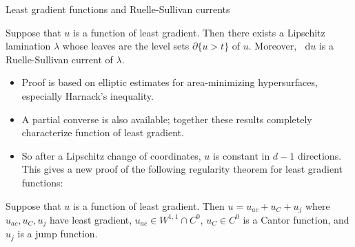 \documentclass[10pt]{beamer}
\newcommand*\dif{\mathop{}\!\mathrm{d}}
\begin{document}
\begin{frame}{Least gradient functions and Ruelle-Sullivan currents}
\begin{theorem}[B '23]
Suppose that $u$ is a function of least gradient. Then there exists a Lipschitz lamination $\lambda$ whose leaves are the level sets $\partial \{u > t\}$ of $u$.
Moreover, $\dif u$ is a Ruelle-Sullivan current of $\lambda$.
\end{theorem} \pause

\begin{itemize}
    \item Proof is based on elliptic estimates for area-minimizing hypersurfaces, especially Harnack's inequality. \pause
    \item A partial converse is also available; together these results completely characterize function of least gradient. \pause
    \item So after a Lipschitz change of coordinates, $u$ is constant in $d - 1$ directions. This gives a new proof of the following regularity theorem for least gradient functions: \pause
\end{itemize}

\begin{theorem}
Suppose that $u$ is a function of least gradient. 
Then $u = u_{ac} + u_C + u_j$ where $u_{ac}, u_C, u_j$ have least gradient, $u_{ac} \in W^{1, 1} \cap C^0$, $u_C \in C^0$ is a Cantor function, and $u_j$ is a jump function.
\end{theorem}
\end{frame}



\end{document}
